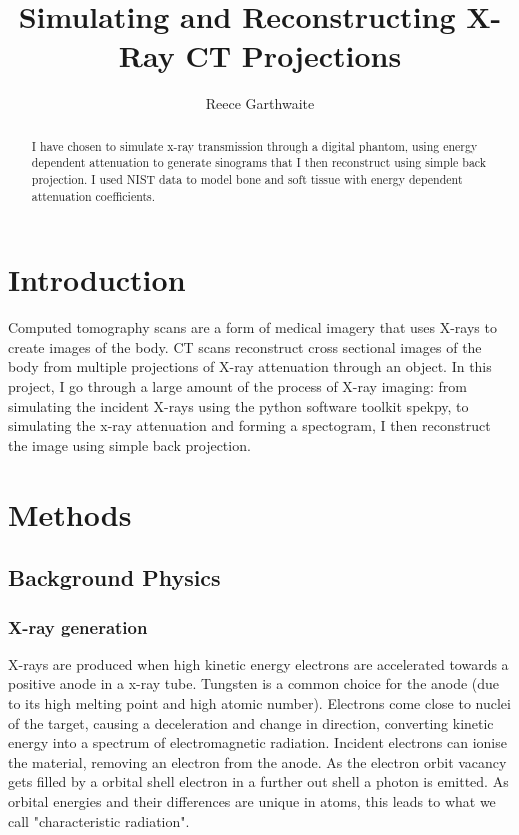 \documentclass{article}
\title{Simulating and Reconstructing X-Ray CT Projections}
\author{Reece Garthwaite}
\date{}
\begin{document}
\maketitle

\begin{abstract}
I have chosen to simulate x-ray transmission through a digital phantom, using energy dependent attenuation to generate sinograms that I then reconstruct using simple back projection. I used NIST data to model bone and soft tissue with energy dependent attenuation coefficients.
\end{abstract}

\section{Introduction}
Computed tomography scans are a form of medical imagery that uses X-rays to  create images of the body. CT scans reconstruct cross sectional images of the body from multiple projections of X-ray attenuation through an object. In this project, I go through a large amount of the process of X-ray imaging: from simulating the incident X-rays using the python software toolkit spekpy, to simulating the x-ray attenuation and forming a spectogram, I then reconstruct the image using simple back projection.

\section{Methods}

\subsection{Background Physics}
\subsubsection{X-ray generation}
X-rays are produced when high kinetic energy electrons are accelerated towards a positive anode in a x-ray tube. Tungsten is a common choice for the anode (due to its high melting point and high atomic number). Electrons come close to nuclei of the target, causing a deceleration and change in direction, converting kinetic energy into a spectrum of electromagnetic radiation. Incident electrons can ionise the material, removing an electron from the anode. As the electron orbit vacancy gets filled by a orbital shell electron in a further out shell a photon is emitted. As orbital energies and their differences are unique in atoms, this leads to what we call "characteristic radiation".
\cite{Tafti}
\end{document}
